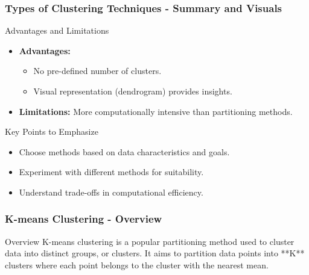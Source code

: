 \documentclass[aspectratio=169]{beamer}
\begin{document}
\begin{frame}[fragile]
    \frametitle{Types of Clustering Techniques - Summary and Visuals}
    \begin{block}{Advantages and Limitations}
    \begin{itemize}
        \item \textbf{Advantages:} 
        \begin{itemize}
            \item No pre-defined number of clusters.
            \item Visual representation (dendrogram) provides insights.
        \end{itemize}
        \item \textbf{Limitations:} More computationally intensive than partitioning methods.
    \end{itemize}
    \end{block}

    \begin{block}{Key Points to Emphasize}
    \begin{itemize}
        \item Choose methods based on data characteristics and goals.
        \item Experiment with different methods for suitability.
        \item Understand trade-offs in computational efficiency.
    \end{itemize}
    \end{block}
\end{frame}

\begin{frame}[fragile]
    \frametitle{K-means Clustering - Overview}
    \begin{block}{Overview}
        K-means clustering is a popular partitioning method used to cluster data into distinct groups, or clusters. It aims to partition data points into **K** clusters where each point belongs to the cluster with the nearest mean.
    \end{block}
\end{frame}
\end{document}
